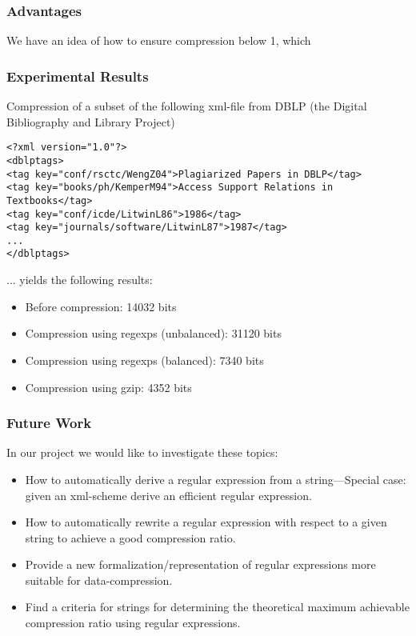 \documentclass[slidestop,compress,mathserif, xcolor=table]{beamer}
\begin{document}
\begin{frame}
  \frametitle{Advantages}

  We have an idea of how to ensure compression below 1, which
\end{frame}

\begin{frame}[fragile]
  \frametitle{Experimental Results}

  Compression of a subset of the following xml-file from DBLP (the Digital Bibliography and Library Project)

{\tiny
\begin{verbatim}
<?xml version="1.0"?>
<dblptags>
<tag key="conf/rsctc/WengZ04">Plagiarized Papers in DBLP</tag>
<tag key="books/ph/KemperM94">Access Support Relations in Textbooks</tag>
<tag key="conf/icde/LitwinL86">1986</tag>
<tag key="journals/software/LitwinL87">1987</tag>
...
</dblptags>
\end{verbatim}
} 

  ... yields the following results:

  \begin{itemize}
  \item Before compression: 14032 bits
  \item Compression using regexps (unbalanced): 31120 bits
  \item Compression using regexps (balanced): 7340 bits
  \item Compression using gzip: 4352 bits
  \end{itemize}

\end{frame}

\begin{frame}[fragile]
  \frametitle{Future Work}

In our project we would like to investigate these topics:

  \begin{itemize}
  \item How to automatically derive a regular expression from a string---Special case: given an xml-scheme derive an efficient regular expression.
  \item How to automatically rewrite a regular expression with respect to a given string to achieve a good compression ratio.
  \item Provide a new formalization/representation of regular expressions more suitable for data-compression.
  \item Find a criteria for strings for determining the theoretical maximum achievable compression ratio using regular expressions.
  \end{itemize}

\end{frame}
\end{document}
